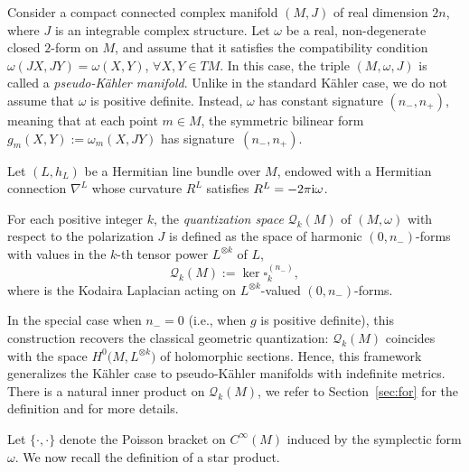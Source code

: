 \documentclass[pdftex]{sigma}
\numberwithin{equation}{section}
\begin{document}
	 Consider a compact connected complex manifold $(M, J)$ of real dimension $2n$, where $J$ is an integrable complex structure. Let $\omega$ be a real, non-degenerate closed $2$-form on $M$, and assume that it satisfies the compatibility condition
		$
		\omega(JX, JY) = \omega(X, Y)$, $ \forall X,Y \in TM$.
		In this case, the triple $(M, \omega, J)$ is called a \emph{pseudo-K\"ahler manifold}. Unlike in the standard K\"ahler case, we do not assume that $\omega$ is positive definite. Instead, $\omega$ has constant signature $(n_-, n_+)$, meaning that at each point $m \in M$, the symmetric bilinear form $g_m(X,Y) := \omega_m(X, JY)$ has signature~${(n_-, n_+)}$.
		
		Let $(L, h_L)$ be a Hermitian line bundle over $M$, endowed with a Hermitian connection $\nabla^L$ whose curvature $R^L$ satisfies
		$
		R^L = -2\pi {\rm i} \omega$.
		

		\begin{Definition}
			For each positive integer $k$, the \emph{quantization space} $\mathcal{Q}_k(M)$ of $(M, \omega)$ with respect to the polarization $J$ is defined as the space of harmonic $(0,n_-)$-forms with values in the $k$-th tensor power $L^{\otimes k}$ of $L$,
\[
			\mathcal{Q}_k(M) := \ker \square^{(n_-)}_k,
\]
			where  is the Kodaira Laplacian acting on $L^{\otimes k}$-valued $(0,n_-)$-forms.
		\end{Definition}
		
		In the special case when $n_- = 0$ (i.e., when $g$ is positive definite), this construction recovers the classical geometric quantization: $\mathcal{Q}_k(M)$ coincides with the space $H^0\bigl(M, L^{\otimes k}\bigr)$ of holomorphic sections. Hence, this framework generalizes the K\"ahler case to pseudo-K\"ahler manifolds with indefinite metrics. There is a natural inner product on $\mathcal{Q}_k(M)$, we refer to Section~\ref{sec:for} for the definition and for more details.
		
		Let $\{\cdot ,\cdot\}$ denote the Poisson bracket on $C^\infty(M)$ induced by the symplectic form $\omega$.
		We now recall the definition of a star product.
	
\end{document}
